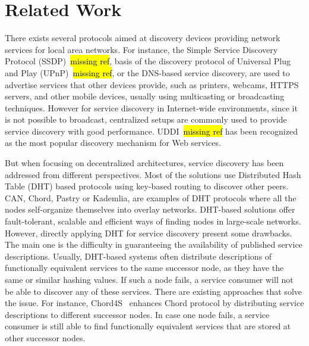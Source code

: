 
\section{Related Work}

There exists several protocols aimed at discovery devices providing network services for local area networks.
For instance, the Simple Service Discovery Protocol (SSDP)~\hl{missing ref},  basis of the discovery protocol of Universal Plug and Play (UPnP)~\hl{missing ref},  or the DNS-based service discovery,  are used to advertise services that other devices provide,  such as printers,  webcams,  HTTPS servers, and other mobile devices,  usually using multicasting or broadcasting techniques.
However for service discovery in Internet-wide environments, since it is not possible to broadcast,
centralized setups are commonly used to provide service discovery with good performance.
UDDI~\hl{missing ref} has been recognized as the most popular discovery mechanism for
Web services.

But when focusing on decentralized architectures,  service discovery has been addressed from different perspectives. 
Most of the solutions use Distributed Hash Table (DHT) based protocols using key-based routing to discover other peers. 
CAN, Chord,  Pastry or Kademlia,  are examples of DHT protocols where all the nodes self-organize themselves into overlay networks. 
DHT-based solutions offer fault-tolerant,  scalable and efficient ways of finding nodes in large-scale networks.
However,  directly applying DHT for service discovery  present some drawbacks.
The main one is the difficulty in guaranteeing the availability of published service descriptions.
Usually,  DHT-based systems often distribute descriptions of functionally equivalent services to the same successor node,  as they have the same or similar hashing values. 
If such a node fails, a service consumer will not be able to discover any of these services. 
There are existing approaches that solve the issue. 
For instance,  Chord4S~\cite{chord4s} enhances Chord protocol by distributing service descriptions to different successor nodes. 
In case one node fails, a service consumer is still able to find functionally equivalent services that are stored at other successor nodes.

